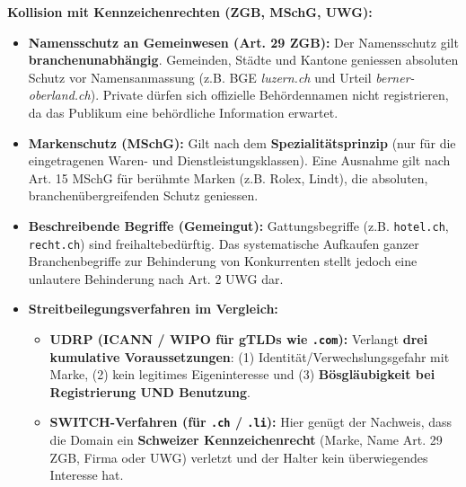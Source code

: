 \begin{definition}
    \textbf{Kollision mit Kennzeichenrechten (ZGB, MSchG, UWG):}
    \begin{itemize}
        \item \textbf{Namensschutz an Gemeinwesen (Art. 29 ZGB):} Der Namensschutz gilt \textbf{branchenunabhängig}. Gemeinden, Städte und Kantone geniessen absoluten Schutz vor Namensanmassung (z.B. BGE \textit{luzern.ch} und Urteil \textit{berner-oberland.ch}). Private dürfen sich offizielle Behördennamen nicht registrieren, da das Publikum eine behördliche Information erwartet.
        \item \textbf{Markenschutz (MSchG):} Gilt nach dem \textbf{Spezialitätsprinzip} (nur für die eingetragenen Waren- und Dienstleistungsklassen). Eine Ausnahme gilt nach Art. 15 MSchG für berühmte Marken (z.B. Rolex, Lindt), die absoluten, branchenübergreifenden Schutz geniessen.
        \item \textbf{Beschreibende Begriffe (Gemeingut):} Gattungsbegriffe (z.B. \texttt{hotel.ch}, \texttt{recht.ch}) sind freihaltebedürftig. Das systematische Aufkaufen ganzer Branchenbegriffe zur Behinderung von Konkurrenten stellt jedoch eine unlautere Behinderung nach Art. 2 UWG dar.
        \item \textbf{Streitbeilegungsverfahren im Vergleich:}
        \begin{itemize}
            \item \textbf{UDRP (ICANN / WIPO für gTLDs wie \texttt{.com}):} Verlangt \textbf{drei kumulative Voraussetzungen}: (1) Identität/Verwechslungsgefahr mit Marke, (2) kein legitimes Eigeninteresse und (3) \textbf{Bösgläubigkeit bei Registrierung UND Benutzung}.
            \item \textbf{SWITCH-Verfahren (für \texttt{.ch} / \texttt{.li}):} Hier genügt der Nachweis, dass die Domain ein \textbf{Schweizer Kennzeichenrecht} (Marke, Name Art. 29 ZGB, Firma oder UWG) verletzt und der Halter kein überwiegendes Interesse hat.
        \end{itemize}
    \end{itemize}
\end{definition}

